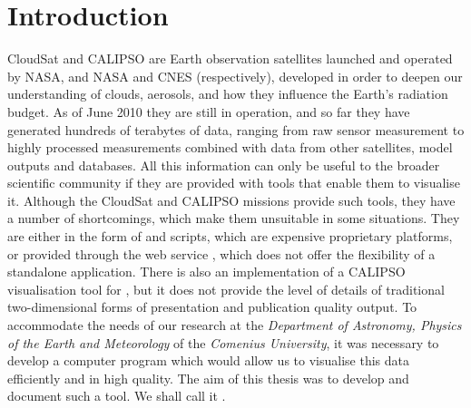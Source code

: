 \chapter{Introduction}
CloudSat and CALIPSO are Earth observation satellites launched and operated by
NASA, and NASA
and CNES (respectively), developed in order to deepen our understanding of
clouds,
aerosols, and how they influence the Earth's radiation budget. As of June 2010
they are still in operation, and so far they have generated hundreds of
terabytes of data, ranging from raw sensor measurement to highly processed
measurements combined with data from other satellites, model outputs and
databases. All this information can only be useful to the broader scientific
community if they are provided with tools that enable them to visualise it.
Although the CloudSat and CALIPSO missions provide such tools, they have a
number of shortcomings, which make them unsuitable in some situations. They are
either in the form of  and  scripts, which
are expensive proprietary platforms, or provided through the web service
, which does not offer the flexibility of a standalone
application. There is also an implementation of a CALIPSO visualisation tool for
, but it does not provide the level of details of
traditional two-dimensional forms of presentation and publication quality
output.
To accommodate the needs of our research at the \textit{Department of Astronomy,
Physics of the Earth and Meteorology} of the \textit{Comenius University}, it
was necessary to develop a computer program which would allow us to visualise 
this data efficiently and in high quality.
The aim of this thesis was to develop and document such a tool. We shall call it
\ccplot.

